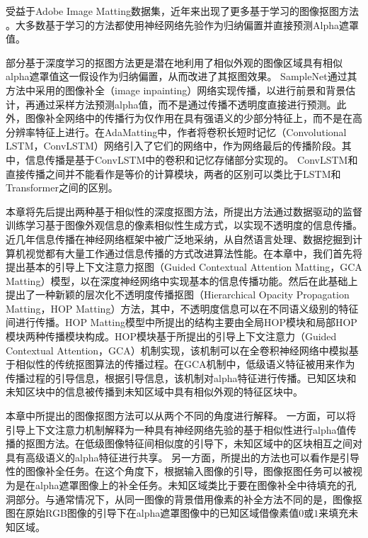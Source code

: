受益于Adobe Image Matting数据集\cite{xu2017deep}，近年来出现了更多基于学习的图像抠图方法 \cite{xu2017deep,lutz2018alphagan,lu2019indices,samplenet,cai2019disentangled,hou2019context}。大多数基于学习的方法都使用神经网络先验作为归纳偏置并直接预测Alpha遮罩值。

部分基于深度学习的抠图方法\cite{samplenet,cai2019disentangled}更是潜在地利用了相似外观的图像区域具有相似alpha遮罩值这一假设作为归纳偏置，从而改进了其抠图效果。
SampleNet\cite{samplenet}通过其方法中采用的图像补全（image inpainting）网络\cite{yu2018generative}实现传播，以进行前景和背景估计，再通过采样方法预测alpha值，而不是通过传播不透明度直接进行预测。此外，图像补全网络中的传播行为仅作用在具有强语义的少部分特征上，而不是在高分辨率特征上进行。在AdaMatting\cite{cai2019disentangled}中，作者将卷积长短时记忆（Convolutional LSTM，ConvLSTM）网络\cite{xingjian2015convolutional}引入了它们的网络中，作为网络最后的传播阶段。其中，信息传播是基于ConvLSTM中的卷积和记忆存储部分实现的。
ConvLSTM和直接传播之间并不能看作是等价的计算模块，两者的区别可以类比于LSTM\cite{hochreiter1997long}和Transformer\cite{vaswani2017attention}之间的区别。

本章将先后提出两种基于相似性的深度抠图方法，所提出方法通过数据驱动的监督训练学习基于图像外观信息的像素相似性生成方式，以实现不透明度的信息传播。近几年信息传播在神经网络框架中被广泛地采纳，从自然语言处理\cite{vaswani2017attention,yang2019xlnet}、数据挖掘\cite{kipf2016semi,velivckovic2017graph}到计算机视觉\cite{yu2018generative,wang2018non}都有大量工作通过信息传播的方式改进算法性能。在本章中，我们首先将提出基本的引导上下文注意力抠图（Guided Contextual Attention Matting，GCA Matting）模型，以在深度神经网络中实现基本的信息传播功能。然后在此基础上提出了一种新颖的层次化不透明度传播抠图（Hierarchical Opacity Propagation Matting，HOP Matting）方法，其中，不透明度信息可以在不同语义级别的特征间进行传播。HOP Matting模型中所提出的结构主要由全局HOP模块和局部HOP模块两种传播模块构成。HOP模块基于所提出的引导上下文注意力（Guided Contextual Attention，GCA）机制实现，该机制可以在全卷积神经网络中模拟基于相似性的传统抠图算法的传播过程。在GCA机制中，低级语义特征被用来作为传播过程的引导信息，根据引导信息，该机制对alpha特征进行传播。已知区块和未知区块中的信息被传播到未知区域中具有相似外观的特征区块中。

本章中所提出的图像抠图方法可以从两个不同的角度进行解释。 一方面，可以将引导上下文注意力机制解释为一种具有神经网络先验的基于相似性进行alpha值传播的抠图方法。在低级图像特征间相似度的引导下，未知区域中的区块相互之间对具有高级语义的alpha特征进行共享。
另一方面，所提出的方法也可以看作是引导性的图像补全任务。在这个角度下，根据输入图像的引导，图像抠图任务可以被视为是在alpha遮罩图像上的补全任务。未知区域类比于要在图像补全中待填充的孔洞部分。与通常情况下，从同一图像的背景借用像素的补全方法不同的是，图像抠图在原始RGB图像的引导下在alpha遮罩图像中的已知区域借像素值$ 0 $或$ 1 $来填充未知区域。

